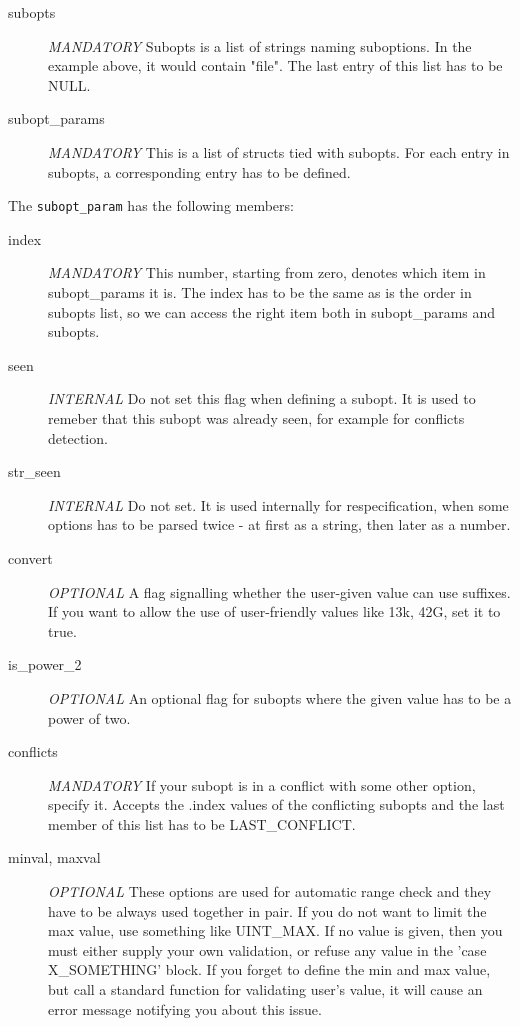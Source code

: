 \begin{desciption}
\begin{description}
\item[subopts] {\em MANDATORY}
  Subopts is a list of strings naming suboptions. In the example above,
  it would contain "file". The last entry of this list has to be NULL.

\item[subopt\_params] {\em MANDATORY}
  This is a list of structs tied with subopts. For each entry in subopts,
  a corresponding entry has to be defined.
\end{description}


The {\tt subopt\_param} has the following members:
\begin{description}
\item[index] {\em MANDATORY}
    This number, starting from zero, denotes which item in subopt\_params
    it is. The index has to be the same as is the order in subopts list,
    so we can access the right item both in subopt\_params and subopts.

\item[seen] {\em INTERNAL}
    Do not set this flag when defining a subopt. It is used to remeber that
    this subopt was already seen, for example for conflicts detection.

\item[str\_seen] {\em INTERNAL}
    Do not set. It is used internally for respecification, when some options
    has to be parsed twice - at first as a string, then later as a number.

\item[convert] {\em OPTIONAL}
    A flag signalling whether the user-given value can use suffixes.
    If you want to allow the use of user-friendly values like 13k, 42G,
    set it to true.

\item[is\_power\_2] {\em OPTIONAL}
    An optional flag for subopts where the given value has to be a power
    of two.

\item[conflicts] {\em MANDATORY}
    If your subopt is in a conflict with some other option, specify it.
    Accepts the .index values of the conflicting subopts and the last
    member of this list has to be LAST\_CONFLICT.

\item[minval, maxval] {\em OPTIONAL}
    These options are used for automatic range check and they have to be
    always used together in pair. If you do not want to limit the max value,
    use something like UINT\_MAX. If no value is given, then you must either
    supply your own validation, or refuse any value in the 'case
    X\_SOMETHING' block. If you forget to define the min and max value, but
    call a standard function for validating user's value, it will cause an
    error message notifying you about this issue.


\end{description}
\end{desciption}
